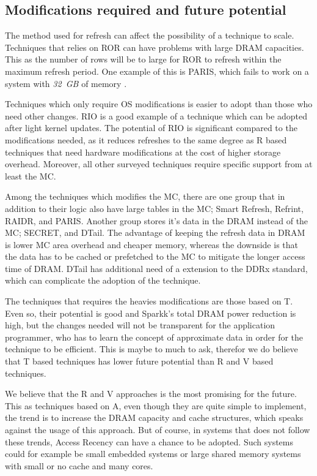 \subsection{Modifications required and future potential}


The method used for refresh can affect the possibility of a technique to scale. Techniques that relies on ROR can have problems with large DRAM capacities. This as the number of rows will be to large for ROR to refresh within the maximum refresh period. One example of this is PARIS, which fails to work on a system with \textit{32~GB} of memory \cite{dtail}. 

Techniques which only require OS modifications is easier to adopt than those who need other changes. RIO is a good example of a technique which can be adopted after light kernel updates. The potential of RIO is significant compared to the modifications needed, as it reduces refreshes to the same degree as R based techniques that need hardware modifications at the cost of higher storage overhead. Moreover, all other surveyed techniques require specific support from at least the MC.

Among the techniques which modifies the MC, there are one group that in addition to their logic also have large tables in the MC; Smart Refresh, Refrint, RAIDR, and PARIS. Another group stores it's data in the DRAM instead of the MC; SECRET, and DTail. The advantage of keeping the refresh data in DRAM is lower MC area overhead and cheaper memory, whereas the downside is that the data has to be cached or prefetched to the MC to mitigate the longer access time of DRAM. DTail has additional need of a extension to the DDRx standard, which can complicate the adoption of the technique.

The techniques that requires the heavies modifications are those based on T. Even so, their potential is good and Sparkk's total DRAM power reduction is high, but the changes needed will not be transparent for the application programmer, who has to learn the concept of approximate data in order for the technique to be efficient. This is maybe to much to ask, therefor we do believe that T based techniques has lower future potential than R and V based techniques.

We believe that the R and V approaches is the most promising for the future. This as techniques based on A, even though they are quite simple to implement, the trend is to increase the DRAM capacity and cache structures, which speaks against the usage of this approach. But of course, in systems that does not follow these trends, Access Recency can have a chance to be adopted. Such systems could for example be small embedded systems or large shared memory systems with small or no cache and many cores. 

